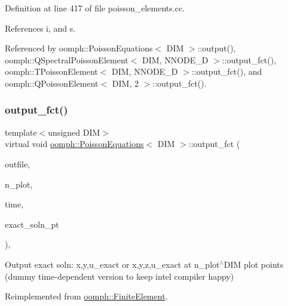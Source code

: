 Definition at line 417 of file poisson\+\_\+elements.\+cc.



References i, and s.



Referenced by oomph\+::\+Poisson\+Equations$<$ D\+I\+M $>$\+::output(), oomph\+::\+Q\+Spectral\+Poisson\+Element$<$ D\+I\+M, N\+N\+O\+D\+E\+\_\+D $>$\+::output\+\_\+fct(), oomph\+::\+T\+Poisson\+Element$<$ D\+I\+M, N\+N\+O\+D\+E\+\_\+D $>$\+::output\+\_\+fct(), and oomph\+::\+Q\+Poisson\+Element$<$ D\+I\+M, 2 $>$\+::output\+\_\+fct().

\mbox{\label{classoomph_1_1PoissonEquations_a6d98964a14b38f4b2e89a2744478f706}} 
\subsubsection{\texorpdfstring{output\+\_\+fct()}{output\_fct()}\hspace{0.1cm}{\footnotesize\ttfamily [2/2]}}
{\footnotesize\ttfamily template$<$unsigned D\+IM$>$ \\
virtual void \hyperlink{classoomph_1_1PoissonEquations}{oomph\+::\+Poisson\+Equations}$<$ D\+IM $>$\+::output\+\_\+fct (\begin{DoxyParamCaption}\item[{std\+::ostream \&}]{outfile,  }\item[{const unsigned \&}]{n\+\_\+plot,  }\item[{const double \&}]{time,  }\item[{\hyperlink{classoomph_1_1FiniteElement_ad4ecf2b61b158a4b4d351a60d23c633e}{Finite\+Element\+::\+Unsteady\+Exact\+Solution\+Fct\+Pt}}]{exact\+\_\+soln\+\_\+pt }\end{DoxyParamCaption})\hspace{0.3cm}{\ttfamily [inline]}, {\ttfamily [virtual]}}



Output exact soln\+: x,y,u\+\_\+exact or x,y,z,u\+\_\+exact at n\+\_\+plot$^\wedge$\+D\+IM plot points (dummy time-\/dependent version to keep intel compiler happy) 



Reimplemented from \hyperlink{classoomph_1_1FiniteElement_a2a8426dccd57b927be0ae0eec00d0479}{oomph\+::\+Finite\+Element}.



